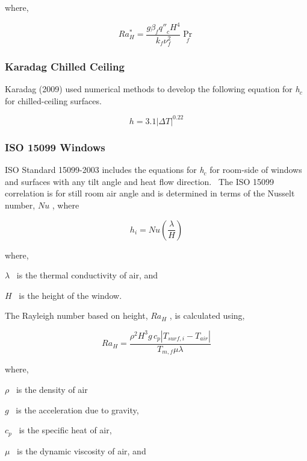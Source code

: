 where,

\begin{equation}
Ra_H^* = \frac{{g{\beta_f}{{q''}_c}{H^4}}}{{{k_f}\nu_f^2}}{\Pr_f}
\end{equation}

\subsubsection{Karadag Chilled Ceiling}\label{karadag-chilled-ceiling}

Karadag (2009) used numerical methods to develop the following equation for \emph{h\(_{c}\)} for chilled-ceiling surfaces.

\begin{equation}
h = 3.1{\left| {\Delta T} \right|^{0.22}}
\end{equation}

\subsubsection{ISO 15099 Windows}\label{iso-15099-windows}

ISO Standard 15099-2003 includes the equations for \emph{h\(_{c}\)} for room-side of windows and surfaces with any tilt angle and heat flow direction.~ The ISO 15099 correlation is for still room air angle and is determined in terms of the Nusselt number, \(Nu\) , where

\begin{equation}
{h_i} = Nu\left( {\frac{\lambda }{H}} \right)
\end{equation}

where,

\(\lambda\) ~is the thermal conductivity of air, and

\(H\) ~is the height of the window.

The Rayleigh number based on height, \(R{a_H}\) , is calculated using,

\begin{equation}
R{a_H} = \frac{{{\rho ^2}{H^3}g\,{c_p}\left| {{T_{surf,i}} - {T_{air}}} \right|}}{{{T_{m,f}}\mu \lambda }}
\end{equation}

where,

\(\rho\) ~is the density of air

\(g\) ~is the acceleration due to gravity,

\({c_p}\) ~is the specific heat of air,

\(\mu\) ~is the dynamic viscosity of air, and

